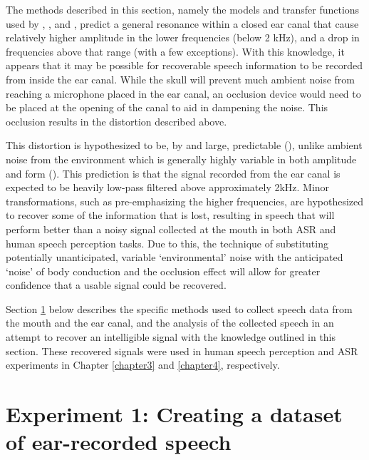 The methods described in this section, namely the models and transfer functions used by \cite{hansen:97b}, \cite{stenfelt:07}, and \cite{reinfeldt:10}, predict a general resonance within a closed ear canal that cause relatively higher amplitude in the lower frequencies (below 2 kHz), and a drop in frequencies above that range (with a few exceptions).  With this knowledge, it appears that it may be possible for recoverable speech information to be recorded from inside the ear canal.  While the skull will prevent much ambient noise from reaching a microphone placed in the ear canal, an occlusion device would need to be placed at the opening of the canal to aid in dampening the noise.  This occlusion results in the distortion described above.

This distortion is hypothesized to be, by and large, predictable (\cite{reinfeldt:10}), unlike ambient noise from the environment which is generally highly variable in both amplitude and form (\cite{zhang:17}). This prediction is that the signal recorded from the ear canal is expected to be heavily low-pass filtered above approximately 2kHz.  Minor transformations, such as pre-emphasizing the higher frequencies, are hypothesized to recover some of the information that is lost, resulting in speech that will perform better than a noisy signal collected at the mouth in both ASR and human speech perception tasks.
Due to this, the technique of substituting potentially unanticipated, variable `environmental' noise with the anticipated `noise' of body conduction and the occlusion effect will allow for greater confidence that a usable signal could be recovered.    

Section \ref{expt1} below describes the specific methods used to collect speech data from the mouth and the ear canal, and the analysis of the collected speech in an attempt to recover an intelligible signal with the knowledge outlined in this section.  These recovered signals were used in human speech perception and ASR experiments in Chapter \ref{chapter3} and \ref{chapter4}, respectively.


\section{Experiment 1: Creating a dataset of ear-recorded speech}\label{expt1}

